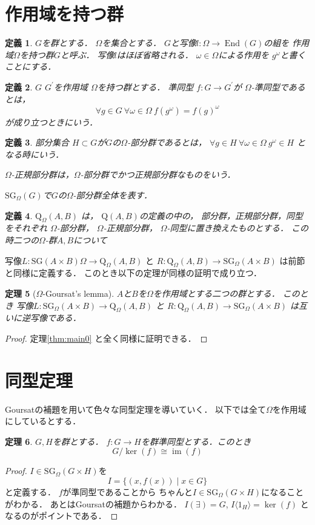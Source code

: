 \documentclass[leqno]{jsarticle}
\newtheorem{thm}{定理}
\newtheorem{df}[thm]{定義}
\DeclareMathOperator{\edmor}{End}
\DeclareMathOperator{\im}{im}
\newcommand{\myprojb}[1]{#1(\exists)}
\newcommand{\mysliceb}[2]{#1\langle #2\rangle}
\newcommand{\myqq}[2]{\mathrm{Q}(#1, #2)}
\newcommand{\mysg}[1]{\mathrm{SG}(#1)}
\newcommand{\myqqo}[3]{\mathrm{Q}_{#3}(#1, #2)}
\newcommand{\mysgo}[2]{\mathrm{SG}_{#2}(#1)}
\newcommand{\mymapl}{L}
\newcommand{\mymapr}{R}
\begin{document}
\section{作用域を持つ群}
\begin{df}
$G$を群とする．
$\Omega$を集合とする．
$G$と写像$l\colon \Omega\to \edmor(G)$の組を
作用域$\Omega$を持つ群$G$と呼ぶ．
写像$l$はほぼ省略される．
$\omega\in \Omega$による作用を
$g^{\omega}$と書くことにする．
\end{df}
\begin{df}
$G$
$G^{\prime}$を作用域
$\Omega$を持つ群とする．
準同型
$f\colon G\to G^{\prime}$が
$\Omega$-準同型であるとは，
\[
\forall g\in G\ \forall \omega\in \Omega\ f(g^{\omega})=f(g)^{\omega}
\]
が成り立つときにいう．
\end{df}

\begin{df}
部分集合
$H\subset G$が$G$の$\Omega$-部分群であるとは，
$\forall g\in H\ \forall \omega\in \Omega \ g^{\omega}\in H$
となる時にいう．

$\Omega$-正規部分群は，$\Omega$-部分群でかつ正規部分群なものをいう．

$\mysgo{G}{\Omega}$で$G$の$\Omega$-部分群全体を表す．

\end{df}

\begin{df}
$\myqqo{A}{B}{\Omega}$
は，
$\myqq{A}{B}$の定義の中の，
部分群，正規部分群，同型をそれぞれ
$\Omega$-部分群，
$\Omega$-正規部分群，
$\Omega$-同型に置き換えたものとする．
この時二つの$\Omega$-群$A, B$について
\end{df}
写像$\mymapl\colon \mysg{A\times B}{\Omega}\to \myqqo{A}{B}{\Omega}$
と
$\mymapr\colon \myqqo{A}{B}{\Omega}\to \mysgo{A\times B}{\Omega}$
は前節と同様に定義する．
このとき以下の定理が同様の証明で成り立つ．


\begin{thm}[$\Omega$-Goursat's lemma]\label{thm:main1}
$A$と$B$を$\Omega$を作用域とする二つの群とする．
このとき
写像$\mymapl\colon \mysgo{A\times B}{\Omega}\to \myqqo{A}{B}{\Omega}$
と
$\mymapr \colon \myqqo{A}{B}{\Omega}\to \mysgo{A\times B}{\Omega}$
は互いに逆写像である．
\end{thm}
\begin{proof}
定理\ref{thm:main0}
と全く同様に証明できる．
\end{proof}

\section{同型定理}
Goursatの補題を用いて色々な同型定理を導いていく．
以下では全て$\Omega$を作用域にしているとする．
\begin{thm}
$G, H$を群とする．
$f:G\to H$を群準同型とする．このとき
\[
G/\ker(f)\cong \im (f)
\]
\end{thm}
\begin{proof}
$I\in \mysgo{G\times H}{\Omega}$を
\[
I=\{(x, f(x))\mid x\in G\}
\]
と定義する．
$f$が準同型であることから
ちゃんと$I\in \mysgo{G\times H}{\Omega}$になることがわかる．
あとはGoursatの補題からわかる．
$\myprojb{I}=G$, 
$\mysliceb{I}{1_{H}}=\ker(f)$
となるのがポイントである．
\end{proof}
\end{document}
